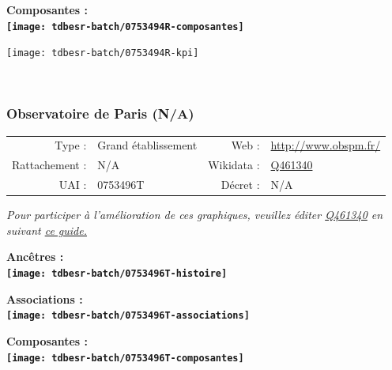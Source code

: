 \documentclass[12pt,french,]{article}
\begin{document}
\begin{center} \bf Composantes : \\  
\texttt{[image: tdbesr-batch/0753494R-composantes]} \end{center}

\begin{center}\texttt{[image: tdbesr-batch/0753494R-kpi]} \end{center}\checkoddpage

\ifoddpage \fi ~\newpage  

\hypertarget{observatoire-de-paris-na}{%
\subsubsection{Observatoire de Paris
(N/A)}\label{observatoire-de-paris-na}}

\begin{tabular*}{\textwidth}{rp{5cm}rl}  
\hline  
Type : & Grand établissement & Web : &\href{http://www.obspm.fr/}{http://www.obspm.fr/} \\  
Rattachement : & N/A & Wikidata : & \href{https://www.wikidata.org/entity/Q461340}{Q461340} \\  
UAI : & 0753496T & Décret : & N/A \\  
\hline  
\end{tabular*}

\textit{\scriptsize Pour participer à l'amélioration de ces graphiques, veuillez éditer  \href{https://www.wikidata.org/entity/Q461340}{Q461340}  en suivant \href{https://github.com/cpesr/wikidataESR/blob/master/Rmd/wikidataESR.md}{ce guide.}}

\vspace{1cm}  
\begin{minipage}[b]{0.50\textwidth}\begin{center} \bf Ancêtres : \\  
\texttt{[image: tdbesr-batch/0753496T-histoire]} \end{center}\end{minipage}\begin{minipage}[b]{0.50\textwidth}\begin{center} \bf Associations : \\  
\texttt{[image: tdbesr-batch/0753496T-associations]} \end{center}\end{minipage}

\hrulefill

\begin{center} \bf Composantes : \\  
\texttt{[image: tdbesr-batch/0753496T-composantes]} \end{center}
\end{document}
